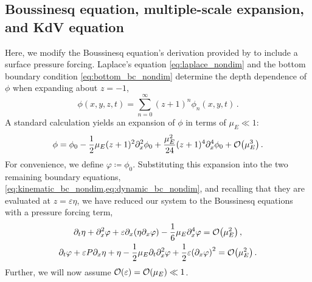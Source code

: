 \documentclass{jfm}
\renewcommand*{\epsilon}{\varepsilon}
\begin{document}
\subsection{Boussinesq equation, multiple-scale expansion, and KdV
equation}
Here, we modify the Boussinesq equation's derivation provided by
\citet{mei2005nonlinear} to include a surface pressure forcing.
Laplace's equation \cref{eq:laplace_nondim} and the bottom boundary
condition \cref{eq:bottom_bc_nondim} determine the depth dependence of
$\phi$ when expanding about $z=-1$,
\begin{equation}
  \phi(x,y,z,t) = \sum_{n=0}^\infty (z+1)^n\phi_n(x,y,t) \,.
\end{equation}
A standard calculation \citep[\eg][]{mei2005nonlinear} yields an
expansion of $\phi$ in terms of $\mu_E \ll 1$:
\begin{equation}
  \phi = \phi_0 - \frac{1}{2}\mu_E (z+1)^2\partial^2_x\phi_0 +
  \frac{\mu_E^2}{24}(z+1)^4\partial^4_x\phi_0 +
  \order{\mu_E^3} \,.
\end{equation}
For convenience, we define $\varphi \coloneqq \phi_0$.
Substituting this expansion into the two remaining boundary equations,
\cref{eq:kinematic_bc_nondim,eq:dynamic_bc_nondim}, and recalling that
they are evaluated at $z=\epsilon \eta$, we have reduced our system to
the Boussinesq equations with a pressure forcing term,
\begin{gather}
  \partial_t \eta + \partial_x^2 \varphi + \epsilon \partial_x
    \pqty{\eta \partial_x \varphi} -\frac{1}{6}\mu_E \partial^4_x
    \varphi = \order{\mu_E^2} \label{eq:kinematic_bc_varphi} \,, \\
  \partial_t \varphi + \epsilon P \partial_x \eta + \eta -
    \frac{1}{2}\mu_E \partial_t \partial_x^2 \varphi +
    \frac{1}{2}\epsilon\pqty{\partial_x \varphi}^2 = \order{\mu_E^2} \,.
    \label{eq:dynamic_bc_varphi}
\end{gather}
Further, we will now assume $\order{\epsilon} = \order{\mu_E} \ll 1$.
\end{document}
